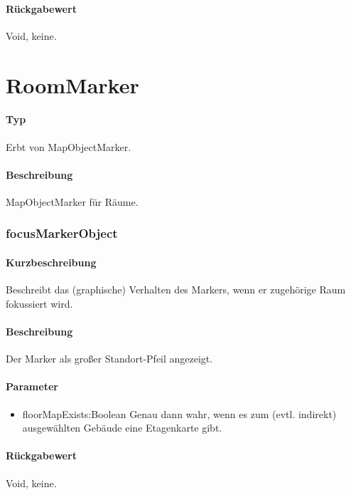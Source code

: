 \paragraph*{Rückgabewert}
Void, keine.


\section{RoomMarker}
\paragraph*{Typ} 
Erbt von MapObjectMarker.
\paragraph*{Beschreibung}
MapObjectMarker für Räume.

\subsubsection{focusMarkerObject}%
\paragraph*{Kurzbeschreibung}
Beschreibt das (graphische) Verhalten des Markers, wenn er zugehörige Raum fokussiert wird.
\paragraph*{Beschreibung}
Der Marker als großer Standort-Pfeil angezeigt.
\paragraph*{Parameter}
\begin{itemize}
    \item floorMapExists:Boolean Genau dann wahr, wenn es zum (evtl. indirekt) ausgewählten Gebäude eine Etagenkarte gibt.
\end{itemize}
\paragraph*{Rückgabewert}
Void, keine.
